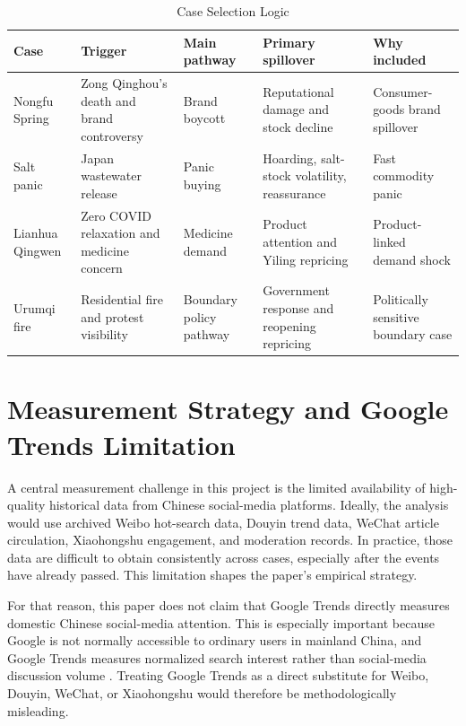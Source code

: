 \documentclass[conference]{IEEEtran}
\begin{document}
\begin{table}[!t]
\centering
\caption{Case Selection Logic}
\label{tab:case_selection}
{\footnotesize
\setlength{\tabcolsep}{4pt}
\begin{tabular}{p{}p{}p{}p{}p{}}
\toprule
Case & Trigger & Main pathway & Primary spillover & Why included \\
\midrule
Nongfu Spring & Zong Qinghou's death and brand controversy & Brand boycott & Reputational damage and stock decline & Consumer-goods brand spillover \\
Salt panic & Japan wastewater release & Panic buying & Hoarding, salt-stock volatility, reassurance & Fast commodity panic \\
Lianhua Qingwen & Zero COVID relaxation and medicine concern & Medicine demand & Product attention and Yiling repricing & Product-linked demand shock \\
Urumqi fire & Residential fire and protest visibility & Boundary policy pathway & Government response and reopening repricing & Politically sensitive boundary case \\
\bottomrule
\end{tabular}
}
\end{table}
\FloatBarrier

\section{Measurement Strategy and Google Trends Limitation}
A central measurement challenge in this project is the limited availability of high-quality historical data from Chinese social-media platforms. Ideally, the analysis would use archived Weibo hot-search data, Douyin trend data, WeChat article circulation, Xiaohongshu engagement, and moderation records. In practice, those data are difficult to obtain consistently across cases, especially after the events have already passed. This limitation shapes the paper's empirical strategy.

For that reason, this paper does not claim that Google Trends directly measures domestic Chinese social-media attention. This is especially important because Google is not normally accessible to ordinary users in mainland China, and Google Trends measures normalized search interest rather than social-media discussion volume \cite{googlechina2010,googlechina2012,googletrendsfaq}. Treating Google Trends as a direct substitute for Weibo, Douyin, WeChat, or Xiaohongshu would therefore be methodologically misleading.
\end{document}
